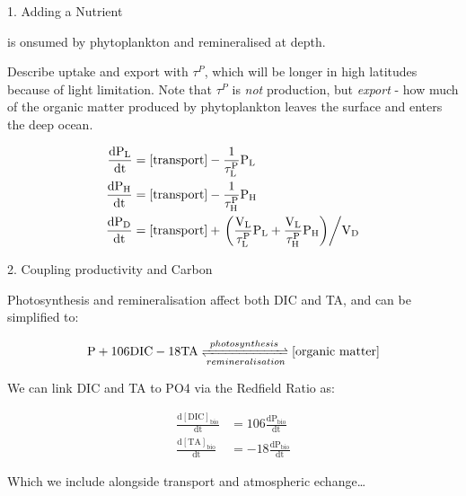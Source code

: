 \documentclass[aspectratio=169]{beamer}
\begin{document}
\begin{frame}{1. Adding a Nutrient}

     is onsumed by phytoplankton and remineralised at depth. 
    
    Describe uptake and export with $\tau^P$, which will be longer in high latitudes because of light limitation. Note that $\tau^P$ is \textit{not} production, but \textit{export} - how much of the organic matter produced by phytoplankton leaves the surface and enters the deep ocean.

    \begin{align*}
        \mathrm{\frac{\mathrm{d}P_L}{\mathrm{d}t}} &= \mathrm{[\mathrm{transport}] - \frac{1}{\tau^P_L} P_L} \\
        \mathrm{\frac{\mathrm{d}P_H}{\mathrm{d}t}} &= \mathrm{[\mathrm{transport}] - \frac{1}{\tau^P_H} P_H} \\
        \mathrm{\frac{\mathrm{d}P_D}{\mathrm{d}t}} &= \mathrm{[\mathrm{transport}] + \left. \left( \frac{V_L}{\tau^P_L} P_L + \frac{V_L}{\tau^P_H} P_H \right) \middle/ V_D \right.}
    \end{align*}

\end{frame}

\begin{frame}{2. Coupling productivity and Carbon}

    Photosynthesis and remineralisation affect both DIC and TA, and can be simplified to:

    $$
    \mathrm{P + 106 DIC - 18 TA \xrightleftharpoons[remineralisation]{photosynthesis} [organic~matter]}
    $$

    We can link DIC and TA to PO4 via the Redfield Ratio as:

    \begin{align*}
        \mathrm{\frac{d[DIC]_{bio}}{dt}} &= \mathrm{106 \frac{dP_{bio}}{dt}} \\
        \mathrm{\frac{d[TA]_{bio}}{dt}} &= \mathrm{-18 \frac{dP_{bio}}{dt}}
    \end{align*}

    Which we include alongside transport and atmospheric echange\dots

\end{frame}
\end{document}
